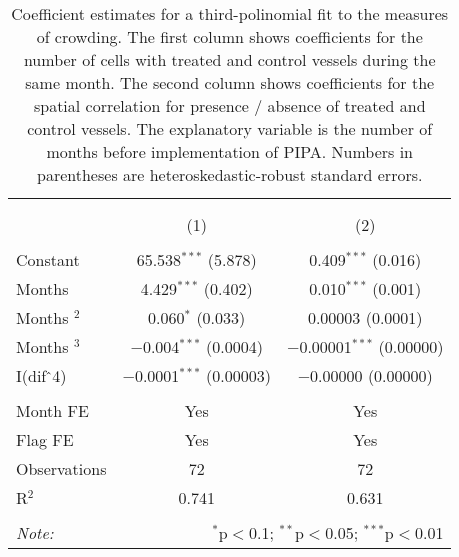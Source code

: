 
\begin{table}[!htbp] \centering 
  \caption{\label{tab:main_DID}Coefficient estimates for a third-polinomial fit to the measures of crowding. The first column shows coefficients for the number of cells with treated and control vessels during the same month. The second column shows coefficients for the spatial correlation for presence / absence of treated and control vessels. The explanatory variable is the number of months before implementation of PIPA. Numbers in parentheses are heteroskedastic-robust standard errors.} 
  \label{} 
\footnotesize 
\begin{tabular}{@{\extracolsep{1pt}}lcc} 
\\[-1.8ex]\hline 
\hline \\[-1.8ex] 
\\[-1.8ex] & (1) & (2)\\ 
\hline \\[-1.8ex] 
 Constant & 65.538$^{***}$ (5.878) & 0.409$^{***}$ (0.016) \\ 
  Months & 4.429$^{***}$ (0.402) & 0.010$^{***}$ (0.001) \\ 
  Months $^2$ & 0.060$^{*}$ (0.033) & 0.00003 (0.0001) \\ 
  Months $^3$ & $-$0.004$^{***}$ (0.0004) & $-$0.00001$^{***}$ (0.00000) \\ 
  I(dif$\hat{\mkern6mu}$4) & $-$0.0001$^{***}$ (0.00003) & $-$0.00000 (0.00000) \\ 
 \hline \\[-1.8ex] 
Month FE & Yes & Yes \\ 
Flag FE & Yes & Yes \\ 
Observations & 72 & 72 \\ 
R$^{2}$ & 0.741 & 0.631 \\ 
\hline 
\hline \\[-1.8ex] 
\textit{Note:}  & \multicolumn{2}{r}{$^{*}$p$<$0.1; $^{**}$p$<$0.05; $^{***}$p$<$0.01} \\ 
\end{tabular} 
\end{table} 
